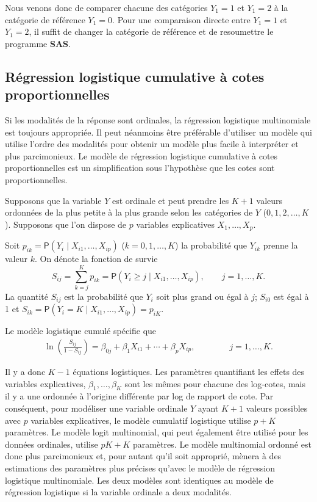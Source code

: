 \documentclass[
  11pt,
  letterpaper,
]{book}
\theoremstyle{definition}
\theoremstyle{definition}
\theoremstyle{definition}
\theoremstyle{definition}
\theoremstyle{remark}
\begin{document}
Nous venons donc de comparer chacune des catégories \(Y_1=1\) et \(Y_1=2\) à la catégorie de référence \(Y_1=0\). Pour une comparaison directe entre \(Y_1=1\) et \(Y_1=2\), il suffit de changer la catégorie de référence et de resoumettre le programme \textbf{SAS}.

\hypertarget{ruxe9gression-logistique-cumulative-uxe0-cotes-proportionnelles}{%
\subsection{Régression logistique cumulative à cotes proportionnelles}\label{ruxe9gression-logistique-cumulative-uxe0-cotes-proportionnelles}}

Si les modalités de la réponse sont ordinales, la régression logistique multinomiale est toujours appropriée. Il peut néanmoins être préférable d'utiliser un modèle qui utilise l'ordre des modalités pour obtenir un modèle plus facile à interpréter et plus parcimonieux. Le modèle de régression logistique cumulative à cotes proportionnelles est un simplification sous l'hypothèse que les cotes sont proportionnelles.

Supposons que la variable \(Y\) est ordinale et peut prendre les \(K+1\) valeurs ordonnées de la plus petite à la plus grande selon les catégories de \(Y\) (\(0, 1, 2, \ldots, K\)). Supposons que l'on dispose de \(p\) variables explicatives \(X_1, \ldots, X_p\).

Soit \(p_{ik}={\mathsf P}\left(Y_i \mid X_{i1}, \ldots, X_{ip}\right)\) (\(k=0, 1, \ldots, K\)) la probabilité que \(Y_{ik}\) prenne la valeur \(k\). On dénote la fonction de survie
\[S_{ij}=\sum_{k=j}^K p_{ik}= {\mathsf P}\left(Y_{i} \geq j\mid X_{i1}, \ldots, X_{ip}\right), \qquad j=1, \ldots, K.
\]
La quantité \(S_{ij}\) est la probabilité que \(Y_i\) soit plus grand ou égal à \(j\); \(S_{i0}\) est égal à 1 et \(S_{ik} = {\mathsf P}\left(Y_i=K \mid X_{i1}, \ldots, X_{ip}\right)=p_{iK}\).

Le modèle logistique cumulé spécifie que
\begin{align*}
\ln \left( \frac{S_{ij}}{1-S_{ij}}\right) = \beta_{0j} + \beta_1 X_{i1} + \cdots + \beta_p X_{ip}, \qquad \qquad  j=1, \ldots, K.
\end{align*}

Il y a donc \(K-1\) équations logistiques. Les paramètres quantifiant les effets des variables explicatives, \(\beta_1, \ldots, \beta_K\) sont les mêmes pour chacune des log-cotes, mais il y a une ordonnée à l'origine différente par log de rapport de cote. Par conséquent, pour modéliser une variable ordinale \(Y\) ayant \(K+1\) valeurs possibles avec \(p\) variables explicatives, le modèle cumulatif logistique utilise \(p + K\) paramètres. Le modèle logit multinomial, qui peut également être utilisé pour les données ordinales, utilise \(pK + K\) paramètres. Le modèle multinomial ordonné est donc plus parcimonieux et, pour autant qu'il soit approprié, mènera à des estimations des paramètres plus précises qu'avec le modèle de régression logistique multinomiale. Les deux modèles sont identiques au modèle de régression logistique si la variable ordinale a deux modalités.
\end{document}
